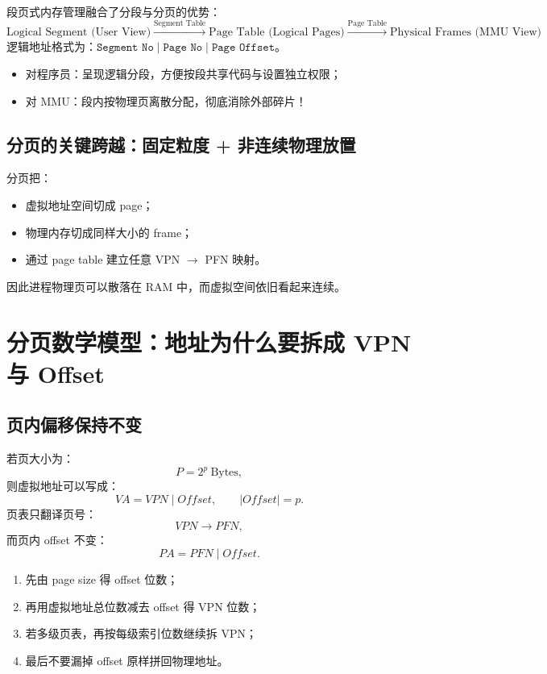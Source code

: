 \documentclass[11pt,a4paper]{ctexart}
\newcommand{\code}[1]{\texttt{#1}}
\begin{document}
段页式内存管理融合了分段与分页的优势：
\[
\boxed{
\text{Logical Segment (User View)}
\xrightarrow{\text{Segment Table}}
\text{Page Table (Logical Pages)}
\xrightarrow{\text{Page Table}}
\text{Physical Frames (MMU View)}
}
\]
逻辑地址格式为：$\code{Segment No} \mid \code{Page No} \mid \code{Page Offset}$。
\begin{itemize}
  \item 对程序员：呈现逻辑分段，方便按段共享代码与设置独立权限；
  \item 对 MMU：段内按物理页离散分配，彻底消除外部碎片！
\end{itemize}

\subsection{分页的关键跨越：固定粒度 + 非连续物理放置}
分页把：
\begin{itemize}
  \item 虚拟地址空间切成 page；
  \item 物理内存切成同样大小的 frame；
  \item 通过 page table 建立任意 VPN $\to$ PFN 映射。
\end{itemize}
因此进程物理页可以散落在 RAM 中，而虚拟空间依旧看起来连续。

\section{分页数学模型：地址为什么要拆成 VPN 与 Offset}

\subsection{页内偏移保持不变}
若页大小为：
\[
P=2^p\ \text{Bytes},
\]
则虚拟地址可以写成：
\[
\boxed{VA=VPN\mid Offset},\qquad |Offset|=p.
\]
页表只翻译页号：
\[
VPN\to PFN,
\]
而页内 offset 不变：
\[
\boxed{PA=PFN\mid Offset}.
\]

\begin{method}[地址题第一反应]
\begin{enumerate}
  \item 先由 page size 得 offset 位数；
  \item 再用虚拟地址总位数减去 offset 得 VPN 位数；
  \item 若多级页表，再按每级索引位数继续拆 VPN；
  \item 最后不要漏掉 offset 原样拼回物理地址。
\end{enumerate}
\end{method}
\end{document}
